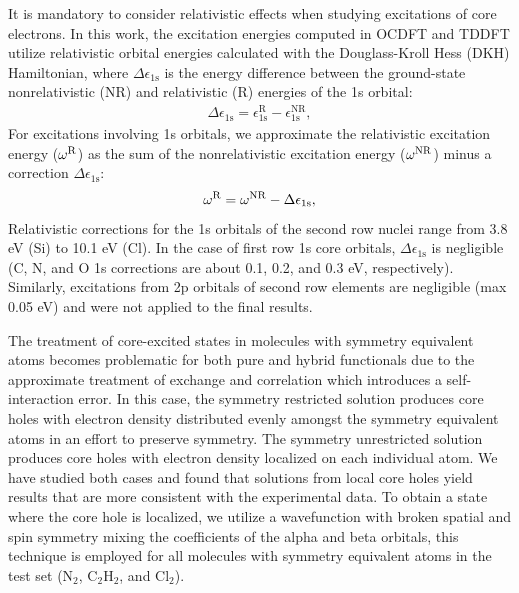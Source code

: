 \documentclass[12pt]{article}
\begin{document}
It is mandatory to consider relativistic effects when studying excitations of core electrons.\cite{maganas_l-edge_2014,debeer_george_calibration_2010,bauer_herfd-xas_2014,ankudinov_sensitivity_2002}
In this work, the excitation energies computed in OCDFT and TDDFT utilize relativistic orbital energies calculated with the Douglass-Kroll Hess (DKH) Hamiltonian,\cite{douglas_quantum_1973,hess_applicability_1985, hess_relativistic_1986} where $\Delta\epsilon_{\text{1s}}$ is the energy difference between the ground-state nonrelativistic (NR) and relativistic (R) energies of the 1s orbital:
\begin{align}
\Delta\epsilon_{\text{1s}} = \epsilon_{\text{1s}}^{\text{R}} - \epsilon_{\text{1s}}^{\text{NR}},
\end{align}
For excitations involving 1s orbitals, we approximate the relativistic excitation energy ($\omega^{\rm R}$) as the sum of the nonrelativistic excitation energy ($ \omega^{\rm NR}$) minus a correction $\Delta\epsilon_{\text{1s}}$:
\begin{align}
\omega^{\rm R} = \omega^{\rm NR} - \Delta\epsilon_{\text{1s}} ,
\end{align}
Relativistic corrections for the 1s orbitals of the second row nuclei range from 3.8 eV (Si) to 10.1 eV (Cl). 
In the case of first row 1s core orbitals, $\Delta\epsilon_{\text{1s}}$ is negligible (C, N, and O 1s corrections are about 0.1, 0.2, and 0.3 eV, respectively).  Similarly, excitations from 2p orbitals of second row elements are negligible (max 0.05 eV) and were not applied to the final results.

The treatment of core-excited states in molecules with symmetry equivalent atoms becomes problematic for both pure and hybrid functionals due to the approximate treatment of exchange and correlation which introduces a self-interaction error.\cite{bally_incorrect_1997,lundberg_quantifying_2005} In this case, the symmetry restricted solution produces core holes with electron density distributed evenly amongst the symmetry equivalent atoms in an effort to preserve symmetry. The symmetry unrestricted solution produces core holes with electron density localized on  each individual atom. We have studied both cases and found that solutions from local core holes yield results that are more consistent with the experimental data. To obtain a state where the core hole is localized, we utilize a wavefunction with broken spatial and spin symmetry mixing the coefficients of the alpha and beta orbitals, this technique is employed for all molecules with symmetry equivalent atoms in the test set (N$_2$, C$_2$H$_2$, and Cl$_2$).
\end{document}
